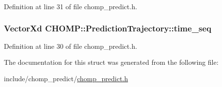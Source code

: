 Definition at line 31 of file chomp\+\_\+predict.\+h.

\subsubsection[{\texorpdfstring{time\+\_\+seq}{time_seq}}]{\setlength{\rightskip}{0pt plus 5cm}Vector\+Xd C\+H\+O\+M\+P\+::\+Prediction\+Trajectory\+::time\+\_\+seq}\hypertarget{struct_c_h_o_m_p_1_1_prediction_trajectory_ae8b2997764b253ed927a7f24cea9a9fe}{}\label{struct_c_h_o_m_p_1_1_prediction_trajectory_ae8b2997764b253ed927a7f24cea9a9fe}


Definition at line 30 of file chomp\+\_\+predict.\+h.



The documentation for this struct was generated from the following file\+:\begin{DoxyCompactItemize}
\item 
include/chomp\+\_\+predict/\hyperlink{chomp__predict_8h}{chomp\+\_\+predict.\+h}\end{DoxyCompactItemize}
